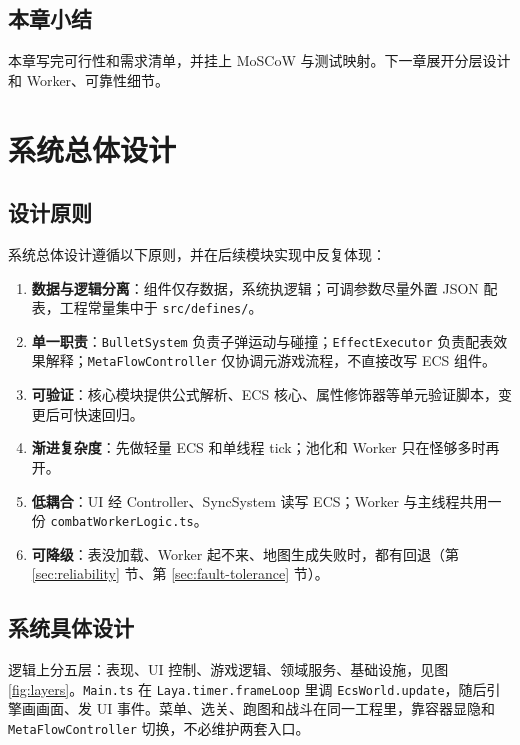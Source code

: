 \documentclass[UTF8,a4paper]{ctexart}
\begin{document}
\section{本章小结}

本章写完可行性和需求清单，并挂上 MoSCoW 与测试映射。下一章展开分层设计和 Worker、可靠性细节。

\chapter{系统总体设计}
\label{chap:architecture}

\section{设计原则}

系统总体设计遵循以下原则，并在后续模块实现中反复体现：

\begin{enumerate}[label=(\arabic*)]
  \item \textbf{数据与逻辑分离}：组件仅存数据，系统执逻辑；可调参数尽量外置 JSON 配表，工程常量集中于 \texttt{src/defines/}\cite{gregory2018game}。
  \item \textbf{单一职责}：\texttt{BulletSystem} 负责子弹运动与碰撞；\texttt{EffectExecutor} 负责配表效果解释；\texttt{MetaFlowController} 仅协调元游戏流程，不直接改写 ECS 组件\cite{briand2001maintainability}。
  \item \textbf{可验证}：核心模块提供公式解析、ECS 核心、属性修饰器等单元验证脚本，变更后可快速回归\cite{petty2010vv}。
  \item \textbf{渐进复杂度}：先做轻量 ECS 和单线程 tick；池化和 Worker 只在怪够多时再开。
  \item \textbf{低耦合}：UI 经 Controller、SyncSystem 读写 ECS；Worker 与主线程共用一份 \texttt{combatWorkerLogic.ts}\cite{ullmann2023coupling}。
  \item \textbf{可降级}：表没加载、Worker 起不来、地图生成失败时，都有回退（第 \ref{sec:reliability} 节、第 \ref{sec:fault-tolerance} 节）。
\end{enumerate}

\section{系统具体设计}
\label{sec:system-design}

逻辑上分五层：表现、UI 控制、游戏逻辑、领域服务、基础设施，见图 \ref{fig:layers}。\texttt{Main.ts} 在 \texttt{Laya.timer.frameLoop} 里调 \texttt{EcsWorld.update}，随后引擎画画面、发 UI 事件。菜单、选关、跑图和战斗在同一工程里，靠容器显隐和 \texttt{MetaFlowController} 切换，不必维护两套入口。
\end{document}
